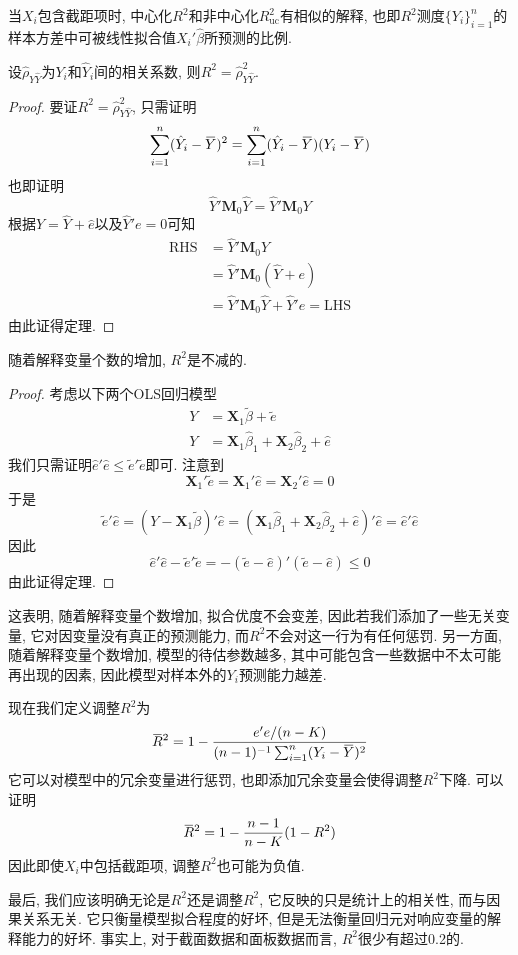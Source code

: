 \documentclass[cn, 12pt, math=mtpro2, bibstyle=apa, blue, twocol]{elegantbook}
\newcommand{\X}{\mathbold{X}}
\newcommand{\hb}{\hat{\beta}}
\newcommand{\overbar}[1]{\mkern 1.5mu\overline{\mkern-1.5mu#1\mkern-1.5mu}\mkern 1.5mu}
\begin{document}
当$X_i$包含截距项时, 中心化$R^2$和非中心化$R_{\text{uc}}^2$有相似的解释, 也即$R^2$测度$\{Y_i\}_{i=1}^n$的样本方差中可被线性拟合值$X_i'\hat{\beta}$所预测的比例.
\begin{theorem}
  设$\hat{\rho}_{Y\hat{Y}}$为$Y_i$和$\hat{Y}_i$间的相关系数, 则$R^2=\hat{\rho}_{Y\hat{Y}}^2$.
\end{theorem}
\begin{proof}
  要证$R^2=\hat{\rho}_{Y\hat{Y}}^2$, 只需证明
  $$\sum_{i=1}^{n}(\hat{Y}_i-\overbar{Y})^2=\sum_{i=1}^{n}(\hat{Y}_i-\overbar{Y})(Y_i-\overbar{Y})$$
  也即证明
  $$\hat{Y}'\mathbold{M}_0\hat{Y}=\hat{Y}'\mathbold{M}_0Y$$
  根据$Y=\hat{Y}+\hat{e}$以及$\hat{Y}'e=0$可知
  \begin{align*}
  \text{RHS}&=\hat{Y}'\mathbold{M}_0Y\\
  &=\hat{Y}'\mathbold{M}_0(\hat{Y}+e) \\
  &=\hat{Y}'\mathbold{M}_0\hat{Y}+\hat{Y}'e=\text{LHS}
  \end{align*}
  由此证得定理.
\end{proof}
\begin{theorem}
  随着解释变量个数的增加, $R^2$是不减的.
\end{theorem}
\begin{proof}
  考虑以下两个OLS回归模型
  \begin{align*}
  Y&=\X_1\tilde{\beta}+\tilde{e} \\
  Y&=\X_1\hat{\beta}_1+\X_2\hat{\beta}_2+\hat{e}
  \end{align*}
  我们只需证明$\hat{e}'\hat{e}\leq\tilde{e}'\tilde{e}$即可. 注意到
  $$\X_1'\tilde{e}=\X_1'\hat{e}=\X_2'\hat{e}=0$$
  于是
  $$\tilde{e}'\hat{e}=(Y-\X_1\tilde{\beta})'\hat{e}=(\X_1\hat{\beta}_1+\X_2\hb_2+\hat{e})'\hat{e}=\hat{e}'\hat{e}$$
  因此
  $$\hat{e}'\hat{e}-\tilde{e}'\tilde{e}=-(\tilde{e}-\hat{e})'(\tilde{e}-\hat{e})\leq0$$
  由此证得定理.
\end{proof}
这表明, 随着解释变量个数增加, 拟合优度不会变差, 因此若我们添加了一些无关变量, 它对因变量没有真正的预测能力, 而$R^2$不会对这一行为有任何惩罚. 另一方面, 随着解释变量个数增加, 模型的待估参数越多, 其中可能包含一些数据中不太可能再出现的因素, 因此模型对样本外的$Y_i$预测能力越差.

现在我们定义调整$R^2$为
$$\overbar{R}^2=1-\frac{e'e/(n-K)}{(n-1)^{-1}\sum_{i=1}^{n}(Y_i-\overbar{Y})^2}$$
它可以对模型中的冗余变量进行惩罚, 也即添加冗余变量会使得调整$R^2$下降. 可以证明
$$\overbar{R}^2=1-\frac{n-1}{n-K}(1-R^2)$$
因此即使$X_i$中包括截距项, 调整$R^2$也可能为负值.

最后, 我们应该明确无论是$R^2$还是调整$R^2$, 它反映的只是统计上的相关性, 而与因果关系无关. 它只衡量模型拟合程度的好坏, 但是无法衡量回归元对响应变量的解释能力的好坏. 事实上, 对于截面数据和面板数据而言, $R^2$很少有超过0.2的.
\end{document}
